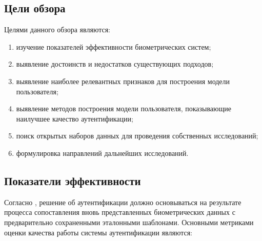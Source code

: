 \documentclass[12pt]{article}
\begin{document}
    \subsection{Цели обзора}
    \label{sec:Overview:Goals}

    \par Целями данного обзора являются:

    \begin{enumerate}
        \item изучение показателей эффективности биометрических систем;
        \item выявление достоинств и недостатков существующих подходов;
        \item выявление наиболее релевантных признаков для построения модели пользователя;
        \item выявление методов построения модели пользователя, показывающие наилучшее качество аутентификации;
        \item поиск открытых наборов данных для проведения собственных исследований;
        \item формулировка направлений дальнейших исследований.
    \end{enumerate}


    \subsection{Показатели эффективности}
    \label{sec:Overview:Metrics}

    \par Согласно \cite{BiometricRecognition, BoiometricSecurity}, решение об аутентификации должно основываться на результате процесса сопоставления вновь представленных биометрических данных с предварительно сохраненными эталонными шаблонами. Основными метриками оценки качества работы системы аутентификации являются:
\end{document}

